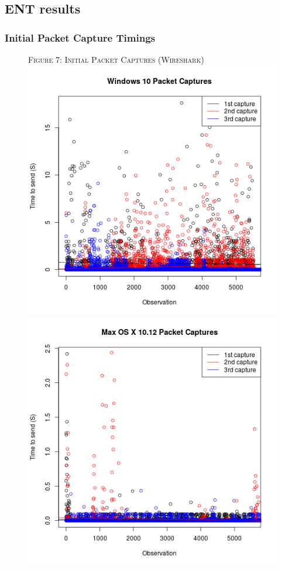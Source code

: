 \documentclass{beamer}
\begin{document}
\subsection{ENT results}
\begin{frame}
\frametitle{Initial Packet Capture Timings}

\begin{figure}
{\tiny \textsc{Figure 7: Initial Packet Captures (Wireshark)}}\\
\includegraphics[scale = 0.22]{images/Neha2.png}
\includegraphics[scale = 0.22]{images/Zeng2.png}

\end{figure}
\end{frame}
\end{document}
